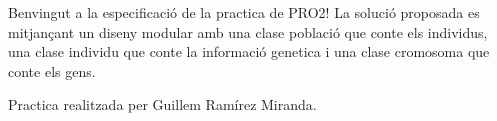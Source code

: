 Benvingut a la especificació de la practica de P\+R\+O2! La solució proposada es mitjançant un diseny modular amb una clase població que conte els individus, una clase individu que conte la informació genetica i una clase cromosoma que conte els gens.

Practica realitzada per Guillem Ramírez Miranda. 